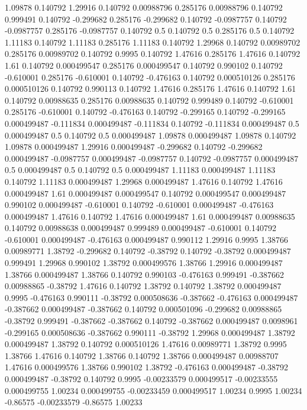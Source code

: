 1.09878 0.140792
1.29916 0.140792
0.00988796 0.285176
0.00988796 0.140792
0.999491 0.140792
-0.299682 0.285176
-0.299682 0.140792
-0.0987757 0.140792
-0.0987757 0.285176
-0.0987757 0.140792
0.5 0.140792
0.5 0.285176
0.5 0.140792
1.11183 0.140792
1.11183 0.285176
1.11183 0.140792
1.29968 0.140792
0.00989702 0.285176
0.00989702 0.140792
0.9995 0.140792
1.47616 0.285176
1.47616 0.140792
1.61 0.140792
0.000499547 0.285176
0.000499547 0.140792
0.990102 0.140792
-0.610001 0.285176
-0.610001 0.140792
-0.476163 0.140792
0.000510126 0.285176
0.000510126 0.140792
0.990113 0.140792
1.47616 0.285176
1.47616 0.140792
1.61 0.140792
0.00988635 0.285176
0.00988635 0.140792
0.999489 0.140792
-0.610001 0.285176
-0.610001 0.140792
-0.476163 0.140792
-0.299165 0.140792
-0.299165 0.000499487
-0.111834 0.000499487
-0.111834 0.140792
-0.111834 0.000499487
0.5 0.000499487
0.5 0.140792
0.5 0.000499487
1.09878 0.000499487
1.09878 0.140792
1.09878 0.000499487
1.29916 0.000499487
-0.299682 0.140792
-0.299682 0.000499487
-0.0987757 0.000499487
-0.0987757 0.140792
-0.0987757 0.000499487
0.5 0.000499487
0.5 0.140792
0.5 0.000499487
1.11183 0.000499487
1.11183 0.140792
1.11183 0.000499487
1.29968 0.000499487
1.47616 0.140792
1.47616 0.000499487
1.61 0.000499487
0.000499547 0.140792
0.000499547 0.000499487
0.990102 0.000499487
-0.610001 0.140792
-0.610001 0.000499487
-0.476163 0.000499487
1.47616 0.140792
1.47616 0.000499487
1.61 0.000499487
0.00988635 0.140792
0.00988638 0.000499487
0.999489 0.000499487
-0.610001 0.140792
-0.610001 0.000499487
-0.476163 0.000499487
0.990112 1.29916
0.9995 1.38766
0.00989771 1.38792
-0.299682 0.140792
-0.38792 0.140792
-0.38792 0.000499487
0.999491 1.29968
0.990102 1.38792
0.000499576 1.38766
1.29916 0.000499487
1.38766 0.000499487
1.38766 0.140792
0.990103 -0.476163
0.999491 -0.387662
0.00988865 -0.38792
1.47616 0.140792
1.38792 0.140792
1.38792 0.000499487
0.9995 -0.476163
0.990111 -0.38792
0.000508636 -0.387662
-0.476163 0.000499487
-0.387662 0.000499487
-0.387662 0.140792
0.000501096 -0.299682
0.00988865 -0.38792
0.999491 -0.387662
-0.387662 0.140792
-0.387662 0.000499487
0.0098961 -0.299165
0.000508636 -0.387662
0.990111 -0.38792
1.29968 0.000499487
1.38792 0.000499487
1.38792 0.140792
0.000510126 1.47616
0.00989771 1.38792
0.9995 1.38766
1.47616 0.140792
1.38766 0.140792
1.38766 0.000499487
0.00988707 1.47616
0.000499576 1.38766
0.990102 1.38792
-0.476163 0.000499487
-0.38792 0.000499487
-0.38792 0.140792
0.9995 -0.00233579
0.000499517 -0.00233555
0.000499755 1.00234
0.000499755 -0.00233459
0.000499517 1.00234
0.9995 1.00234
-0.86575 -0.00233579
-0.86575 1.00233
